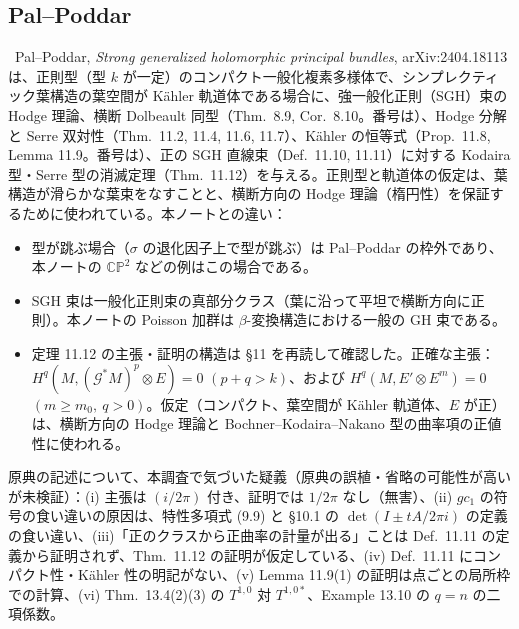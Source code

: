 \subsection{Pal--Poddar}
\tC\ Pal--Poddar, \emph{Strong generalized holomorphic principal bundles}, arXiv:2404.18113 は、正則型（型 $k$ が一定）のコンパクト一般化複素多様体で、シンプレクティック葉構造の葉空間が Kähler 軌道体である場合に、強一般化正則（SGH）束の Hodge 理論、横断 Dolbeault 同型（Thm.\ 8.9, Cor.\ 8.10。番号は\tQ）、Hodge 分解と Serre 双対性（Thm.\ 11.2, 11.4, 11.6, 11.7）、Kähler の恒等式（Prop.\ 11.8, Lemma 11.9。番号は\tQ）、正の SGH 直線束（Def.\ 11.10, 11.11）に対する Kodaira 型・Serre 型の消滅定理（Thm.\ 11.12）を与える。正則型と軌道体の仮定は、葉構造が滑らかな葉束をなすことと、横断方向の Hodge 理論（楕円性）を保証するために使われている。本ノートとの違い：
\begin{itemize}
\item 型が跳ぶ場合（$\sigma$ の退化因子上で型が跳ぶ）は Pal--Poddar の枠外であり、本ノートの $\mathbb{CP}^2$ などの例はこの場合である。
\item SGH 束は一般化正則束の真部分クラス（葉に沿って平坦で横断方向に正則）。本ノートの Poisson 加群は $\beta$-変換構造における一般の GH 束である。
\item 定理 11.12 の主張・証明の構造は \S11 を再読して確認した。正確な主張：$H^q(M,(\mathcal G^*M)^p\otimes E)=0$ $(p+q>k)$、および $H^q(M,E'\otimes E^m)=0$ $(m\ge m_0,\ q>0)$。仮定（コンパクト、葉空間が Kähler 軌道体、$E$ が正）は、横断方向の Hodge 理論と Bochner--Kodaira--Nakano 型の曲率項の正値性に使われる。
\end{itemize}
原典の記述について、本調査で気づいた疑義（原典の誤植・省略の可能性が高いが未検証\tQ）：(i) 主張は $(i/2\pi)$ 付き、証明では $1/2\pi$ なし（無害）、(ii) $gc_1$ の符号の食い違いの原因は、特性多項式 (9.9) と \S10.1 の $\det(I\pm tA/2\pi i)$ の定義の食い違い、(iii)「正のクラスから正曲率の計量が出る」ことは Def.\ 11.11 の定義から証明されず、Thm.\ 11.12 の証明が仮定している、(iv) Def.\ 11.11 にコンパクト性・Kähler 性の明記がない、(v) Lemma 11.9(1) の証明は点ごとの局所枠での計算、(vi) Thm.\ 13.4(2)(3) の $T^{1,0}$ 対 $T^{1,0*}$、Example 13.10 の $q=n$ の二項係数。

